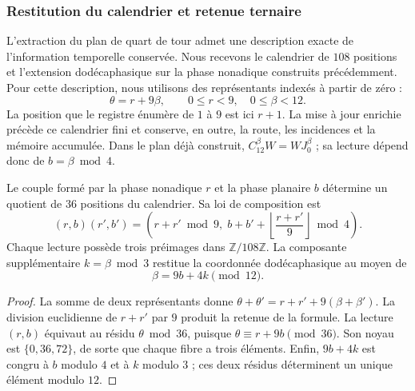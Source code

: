 \subsubsection{Restitution du calendrier et retenue ternaire}
\label{ins29:xii:acarreo}

L’extraction du plan de quart de tour admet une description exacte
de l’information temporelle conservée. Nous recevons le calendrier de
\(108\) positions et l’extension dodécaphasique sur la phase nonadique
construits précédemment. Pour cette description, nous utilisons des représentants
indexés à partir de zéro :
\[
 \theta=r+9\beta,\qquad 0\leq r<9,\quad 0\leq\beta<12.
\]
La position que le registre énumère de \(1\) à \(9\) est ici \(r+1\).
La mise à jour enrichie précède ce calendrier fini et conserve,
en outre, la route, les incidences et la mémoire accumulée. Dans le plan déjà
construit, \(C_{12}^{\beta}W=WJ_0^{\beta}\) ; sa lecture dépend donc
de \(b=\beta\bmod4\).

\begin{proposition}
\label{ins29:xii:fibra}
Le couple formé par la phase nonadique \(r\) et la phase planaire \(b\) détermine
un quotient de \(36\) positions du calendrier. Sa loi de composition est
\[
 (r,b)(r',b')=
 \left(r+r'\bmod9,\;
 b+b'+\left\lfloor\frac{r+r'}9\right\rfloor\bmod4\right).
\]
Chaque lecture possède trois préimages dans \(\mathbb Z/108\mathbb Z\).
La composante supplémentaire \(k=\beta\bmod3\) restitue la coordonnée
dodécaphasique au moyen de
\[
 \beta=9b+4k\pmod{12}.
\]
\end{proposition}
\begin{proof}
La somme de deux représentants donne
\(\theta+\theta'=r+r'+9(\beta+\beta')\). La division euclidienne de
\(r+r'\) par \(9\) produit la retenue de la formule. La lecture
\((r,b)\) équivaut au résidu \(\theta\bmod36\), puisque
\(\theta\equiv r+9b\pmod{36}\). Son noyau est
\(\{0,36,72\}\), de sorte que chaque fibre a trois éléments.
Enfin, \(9b+4k\) est congru à \(b\) modulo \(4\) et à
\(k\) modulo \(3\) ; ces deux résidus déterminent un unique élément
modulo \(12\).
\end{proof}

